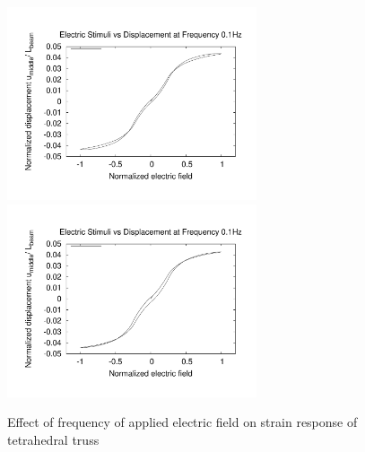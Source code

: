 \begin{figure}
{\includegraphics[width=2.9in]{./chap_5_active_trusses/truss_freq_study/truss_nonlinear_freq_5p0.pdf}}
{\includegraphics[width=2.9in]{./chap_5_active_trusses/truss_freq_study/truss_nonlinear_freq_10p0.pdf}}
\caption{Effect of frequency of applied electric field on strain response of tetrahedral truss}
\label{fig:truss_linear_Frequency_Effect}
\end{figure}
 



\clearpage